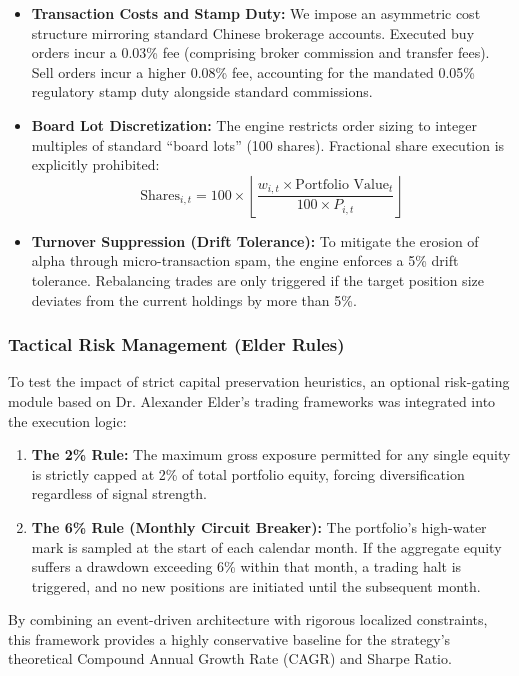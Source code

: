 \documentclass[12pt]{article}
\begin{document}
\begin{itemize}
    \item \textbf{Transaction Costs and Stamp Duty:} We impose an asymmetric cost structure mirroring standard Chinese brokerage accounts. Executed buy orders incur a 0.03\% fee (comprising broker commission and transfer fees). Sell orders incur a higher 0.08\% fee, accounting for the mandated 0.05\% regulatory stamp duty alongside standard commissions.
    \item \textbf{Board Lot Discretization:} The engine restricts order sizing to integer multiples of standard ``board lots'' (100 shares). Fractional share execution is explicitly prohibited:
    $$ \text{Shares}_{i,t} = 100 \times \left\lfloor \frac{w_{i,t} \times \text{Portfolio Value}_{t}}{100 \times P_{i,t}} \right\rfloor $$
    \item \textbf{Turnover Suppression (Drift Tolerance):} To mitigate the erosion of alpha through micro-transaction spam, the engine enforces a 5\% drift tolerance. Rebalancing trades are only triggered if the target position size deviates from the current holdings by more than 5\%.
\end{itemize}

\subsubsection{Tactical Risk Management (Elder Rules)}
To test the impact of strict capital preservation heuristics, an optional risk-gating module based on Dr. Alexander Elder’s trading frameworks \cite{elder2014} was integrated into the execution logic:
\begin{enumerate}
    \item \textbf{The 2\% Rule:} The maximum gross exposure permitted for any single equity is strictly capped at 2\% of total portfolio equity, forcing diversification regardless of signal strength.
    \item \textbf{The 6\% Rule (Monthly Circuit Breaker):} The portfolio's high-water mark is sampled at the start of each calendar month. If the aggregate equity suffers a drawdown exceeding 6\% within that month, a trading halt is triggered, and no new positions are initiated until the subsequent month.
\end{enumerate}

By combining an event-driven architecture with rigorous localized constraints, this framework provides a highly conservative baseline for the strategy's theoretical Compound Annual Growth Rate (CAGR) and Sharpe Ratio.
\end{document}
